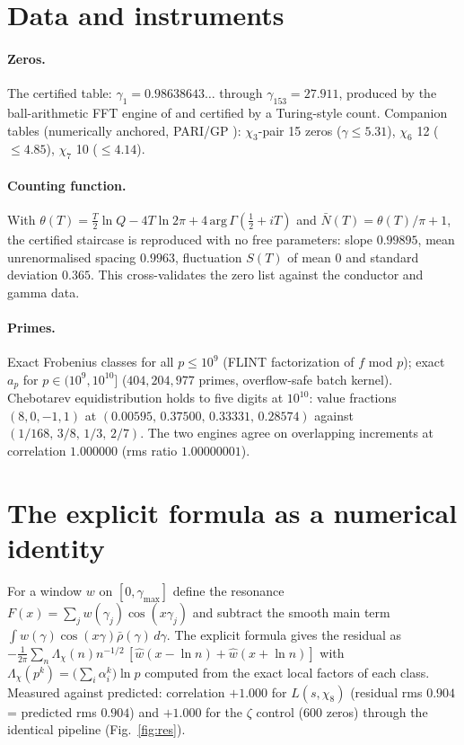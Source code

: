 \documentclass[11pt]{article}
\newcommand{\Lgen}{L(s,\chi_8)}
\begin{document}
\section{Data and instruments}\label{sec:data}
\paragraph{Zeros.} The certified table: $\gamma_1=0.98638643\ldots$ through
$\gamma_{153}=27.911$, produced by the ball-arithmetic FFT engine of
\cite{mainpaper} and certified by a Turing-style count. Companion tables
(numerically anchored, PARI/GP \cite{pari}): $\chi_3$-pair 15 zeros
($\gamma\le5.31$), $\chi_6$ 12 ($\le4.85$), $\chi_7$ 10 ($\le4.14$).

\paragraph{Counting function.} With
$\theta(T)=\tfrac{T}{2}\ln Q-4T\ln2\pi+4\,\mathrm{arg}\,\Gamma(\tfrac12+iT)$
and $\bar N(T)=\theta(T)/\pi+1$, the certified staircase is reproduced with no
free parameters: slope $0.99895$, mean unrenormalised spacing $0.9963$,
fluctuation $S(T)$ of mean $0$ and standard deviation $0.365$. This
cross-validates the zero list against the conductor and gamma data.

\paragraph{Primes.} Exact Frobenius classes for all $p\le10^9$ (FLINT
\cite{flint} factorization of $f$ mod $p$); exact $a_p$ for $p\in(10^9,10^{10}]$
($404{,}204{,}977$ primes, overflow-safe batch kernel). Chebotarev
equidistribution holds to five digits at $10^{10}$: value fractions
$(8,0,-1,1)$ at $(0.00595,\,0.37500,\,0.33331,\,0.28574)$ against
$(1/168,\,3/8,\,1/3,\,2/7)$. The two engines agree on overlapping increments
at correlation $1.000000$ (rms ratio $1.00000001$).

\section{The explicit formula as a numerical identity}
\label{sec:identity}
For a window $w$ on $[0,\gamma_{\max}]$ define the resonance
$F(x)=\sum_j w(\gamma_j)\cos(x\gamma_j)$ and subtract the smooth main term
$\int w(\gamma)\cos(x\gamma)\bar\rho(\gamma)\,d\gamma$. The explicit formula
gives the residual as
$-\tfrac1{2\pi}\sum_n \Lambda_\chi(n)n^{-1/2}\,[\hat w(x-\ln n)+\hat w(x+\ln n)]$
with $\Lambda_\chi(p^k)=\bigl(\sum_i\alpha_i^k\bigr)\ln p$ computed from the
exact local factors of each class. Measured against predicted: correlation
$+1.000$ for $\Lgen$ (residual rms $0.904$ = predicted rms $0.904$) and
$+1.000$ for the $\zeta$ control (600 zeros) through the identical pipeline
(Fig.~\ref{fig:res}).
\end{document}
